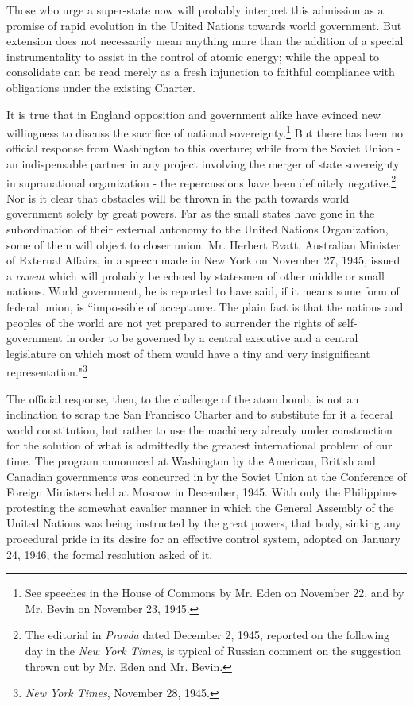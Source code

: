 Those who urge a super-state now will probably interpret this admission as a promise of rapid evolution in the United Nations towards world government. But extension does not necessarily mean anything more than the addition of a special instrumentality to assist in the control of atomic energy; while the appeal to consolidate can be read merely as a fresh injunction to faithful compliance with obligations under the existing Charter.

It is true that in England opposition and government alike have evinced new willingness to discuss the sacrifice of national sovereignty.\footnote{See speeches in the House of Commons by Mr. Eden on November 22, and by Mr. Bevin on November 23, 1945.} But there has been no official response from Washington to this overture; while from the Soviet Union - an indispensable partner in any project involving the merger of state sovereignty in supranational organization - the repercussions have been definitely negative.\footnote{The editorial in \textit{Pravda} dated December 2, 1945, reported on the following day in the \textit{New York Times}, is typical of Russian comment on the suggestion thrown out by Mr. Eden and Mr. Bevin.} Nor is it clear that obstacles will be thrown in the path towards world government solely by great powers. Far as the small states have gone in the subordination of their external autonomy to the United Nations Organization, some of them will object to closer union. Mr. Herbert Evatt, Australian Minister of External Affairs, in a speech made in New York on November 27, 1945, issued a \emph{caveat} which will probably be echoed by statesmen of other middle or small nations. World government, he is reported to have said, if it means some form of federal union, is ``impossible of acceptance. The plain fact is that the nations and peoples of the world are not yet prepared to surrender the rights of self-government in order to be governed by a central executive and a central legislature on which most of them would have a tiny and very insignificant representation."\footnote{\textit{New York Times}, November 28, 1945.}

The official response, then, to the challenge of the atom bomb, is not an inclination to scrap the San Francisco Charter and to substitute for it a federal world constitution, but rather to use the machinery already under construction for the solution of what is admittedly the greatest international problem of our time. The program announced at Washington by the American, British and Canadian governments was concurred in by the Soviet Union at the Conference of Foreign Ministers held at Moscow in December, 1945. With only the Philippines protesting the somewhat cavalier manner in which the General Assembly of the United Nations was being instructed by the great powers, that body, sinking any procedural pride in its desire for an effective control system, adopted on January 24, 1946, the formal resolution asked of it.

